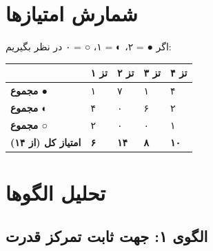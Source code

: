 \documentclass[12pt,a4paper]{book}
\begin{document}
\section{شمارش امتیازها}

\begin{principleBox}
اگر ● = ۲، ◐ = ۱، ○ = ۰ در نظر بگیریم:

\begin{longtable}{%
    >{\centering\arraybackslash}p{}
    >{\centering\arraybackslash}p{}
    >{\centering\arraybackslash}p{}
    >{\centering\arraybackslash}p{}
    >{\centering\arraybackslash}p{}}
\toprule
\rowcolor{cPrimary!10}
& \cellcolor{cGreen!15}\textbf{تز ۱} & \cellcolor{cAccent!10}\textbf{تز ۲} & \cellcolor{cGold!15}\textbf{تز ۳} & \cellcolor{cConsolid!10}\textbf{تز ۴} \\
\midrule

\textbf{مجموع ●} & ۱ & ۷ & ۱ & ۴ \\
\textbf{مجموع ◐} & ۴ & ۰ & ۶ & ۲ \\
\textbf{مجموع ○} & ۲ & ۰ & ۰ & ۱ \\
\midrule
\textbf{امتیاز کل (از ۱۴)} &
\cellcolor{cGreen!15}\textbf{۶} &
\cellcolor{cAccent!10}\textbf{۱۴} &
\cellcolor{cGold!15}\textbf{۸} &
\cellcolor{cConsolid!10}\textbf{۱۰} \\

\bottomrule
\end{longtable}
\end{principleBox}

\section{تحلیل الگوها}

\subsection{الگوی ۱: جهت ثابت تمرکز قدرت}
\end{document}
